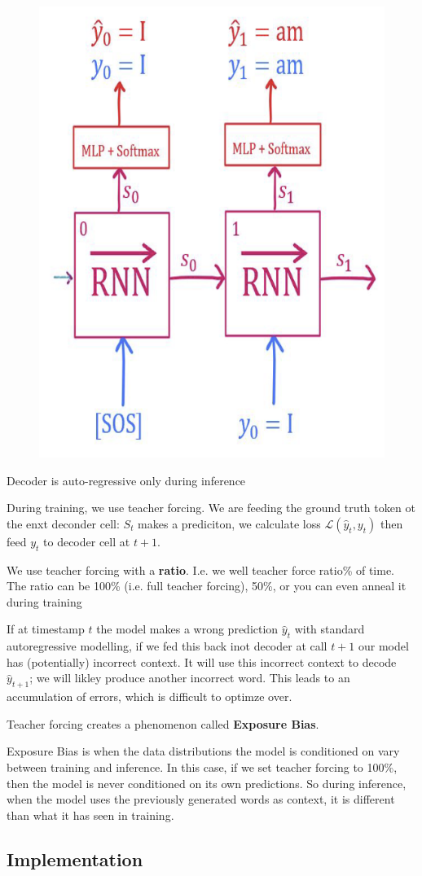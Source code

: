 \documentclass[11pt]{article}
\begin{document}
\begin{figure}[H]
    \centering
    \includegraphics[width=.3\linewidth]{figures/teacher-forcing.png}
\end{figure}

Decoder is auto-regressive only during inference

During training, we use teacher forcing. We are feeding the ground truth token ot the enxt deconder cell: $S_t$ makes a prediciton, we calculate loss $\mathcal L (\hat y_t, y_t)$ then feed $y_t$ to decoder cell at $t+1$.

We use teacher forcing with a \textbf{ratio}. I.e. we well teacher force
ratio\% of time. The ratio can be 100\% (i.e. full teacher forcing), 50\%, or you
can even anneal it during training

If at timestamp $t$ the model makes a wrong prediction $\hat y_t$ with standard autoregressive modelling, if we fed this back inot decoder at call $t+1$ our model has (potentially) incorrect context. It will use this incorrect context to decode $\hat y_{t+1}$; we will likley produce another incorrect word. This leads to an accumulation of errors, which is difficult to optimze over.

Teacher forcing creates a phenomenon called \textbf{Exposure Bias}.

Exposure Bias is when the data distributions the model is conditioned on vary between training and inference. In this case, if we set teacher forcing to 100\%, then the model is never conditioned on its own predictions. So during inference, when the model uses the previously generated words as context, it is different than what it has seen in training.

\subsection{Implementation}
\end{document}
